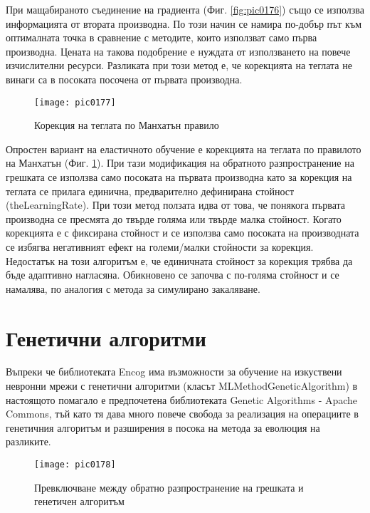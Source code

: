 При мащабираното съединение на градиента (Фиг. \ref{fig:pic0176}) също се използва информацията от втората производна. По този начин се намира по-добър път към оптималната точка в сравнение с методите, които използват само първа производна. Цената на такова подобрение е нуждата от използването на повече изчислителни ресурси. Разликата при този метод е, че корекцията на теглата не винаги са в посоката посочена от първата производна. 

\begin{figure}[h]
  \centering
  \texttt{[image: pic0177]}
  \caption{Корекция на теглата по Манхатън правило}
\label{fig:pic0177}
\end{figure}
\FloatBarrier

Опростен вариант на еластичното обучение е корекцията на теглата по правилото на Манхатън  (Фиг. \ref{fig:pic0177}). При тази модификация на обратното разпространение на грешката се използва само посоката на първата производна като за корекция на теглата се прилага единична, предварително дефинирана стойност (theLearningRate). При този метод ползата идва от това, че понякога първата производна се пресмята до твърде голяма или твърде малка стойност. Когато корекцията е с фиксирана стойност и се използва само посоката на производната се избягва негативният ефект на големи/малки стойности за корекция. Недостатък на този алгоритъм е, че единичната стойност за корекция трябва да бъде адаптивно нагласяна. Обикновено се започва с по-голяма стойност и се намалява, по аналогия с метода за симулирано закаляване. 

\section{Генетични алгоритми}

Въпреки че библиотеката Encog има възможности за обучение на изкуствени невронни мрежи с генетични алгоритми (класът MLMethodGeneticAlgorithm) в настоящото помагало  е предпочетена библиотеката Genetic Algorithms - Apache Commons, тъй като тя дава много повече свобода за реализация на операциите в генетичния алгоритъм и разширения в посока на метода за еволюция на разликите. 

\begin{figure}[h]
  \centering
  \texttt{[image: pic0178]}
  \caption{Превключване между обратно разпространение на грешката и генетичен алгоритъм}
\label{fig:pic0178}
\end{figure}
\FloatBarrier

